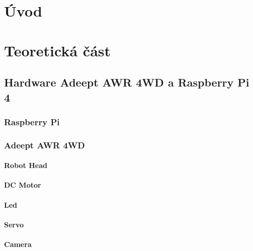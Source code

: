 
%

\chapter{Úvod}

\chapter{Teoretická část} %

\section{Hardware Adeept AWR 4WD a Raspberry Pi 4}

\subsection*{Raspberry Pi}


\subsection*{Adeept AWR 4WD}

\subsubsection*{Robot Head}

\subsubsection*{DC Motor}

\subsubsection*{Led}

\subsubsection*{Servo}

\subsubsection*{Camera}

